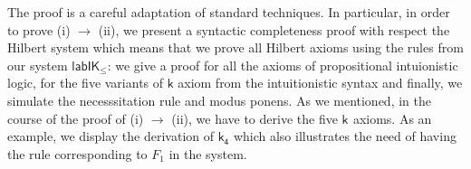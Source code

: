 \documentclass[twoside]{aiml18}
\newcommand*{\ax}[1]{\mathsf{#1}}
\newcommand*{\kax}[1][]		{\ax{k_{#1}}}
\newcommand*{\lab}{\mathsf{lab}}
\newcommand*{\IK}{\mathsf{IK}}
\newcommand*{\labIKp}{\lab\IK_{\le}}
\begin{document}
%
%
%
%
%

The proof is a careful adaptation of standard techniques.
%
In particular, in order to prove (i) $\rightarrow$ (ii), we present a syntactic completeness proof with respect the Hilbert system which means that we prove all Hilbert axioms using the rules from our system $\labIKp$: we give a proof for all the axioms of propositional intuionistic logic, for the five variants of $\mathsf{k}$ axiom from the intuitionistic syntax and finally, we simulate the necesssitation rule and modus ponens. As we mentioned, in the course of the proof of (i) $\rightarrow$ (ii), we have to derive the five $\kax$ axioms. 
%
As an example, we display the derivation of $\kax[4]$ which also illustrates the need of having the rule corresponding to $F_1$ in the system.
\end{document}
